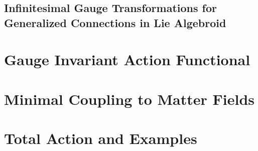 \documentclass[12pt]{report}
\theoremstyle{definition}
\begin{document}
\subsection{Infinitesimal Gauge Transformations for Generalized Connections in Lie Algebroid}

\section{Gauge Invariant Action Functional}

\section{Minimal Coupling to Matter Fields}

\section{Total Action and Examples}

\printbibliography
\end{document}
